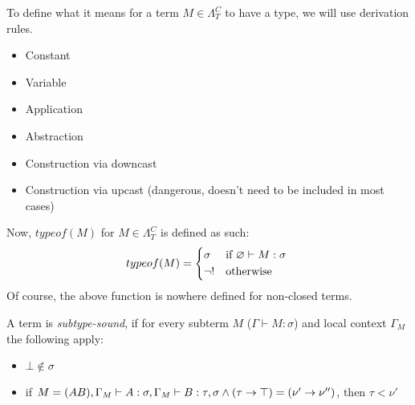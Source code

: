 \documentclass[main.tex]{subfiles}
\begin{document}
\begin{defn}
    To define what it means for a term $M \in \Lambda_T^C$ to have a type,
    we will use derivation rules.
    \begin{itemize}
        \item Constant
        \item Variable
        \item Application
        \item Abstraction
        \item Construction via downcast
        \item Construction via upcast (dangerous, doesn't need to be included in most cases)
    \end{itemize}

    Now, $typeof(M)$ for $M \in \Lambda_T^C$ is defined as such:
    \[
        typeof(M) =
        \begin{cases*}
            \sigma & if $\varnothing \vdash M : \sigma$ \\
            \neg ! & otherwise
        \end{cases*}
    \]
    Of course, the above function is nowhere defined for non-closed terms.
\end{defn}

\begin{defn}
    A term is \emph{subtype-sound}, if for every subterm $M$
    ($\Gamma \vdash M : \sigma$) and local context
    $\Gamma_M$ the following apply:
    \begin{itemize}
        \item $\bot \not \in \sigma$
        \item if $M = (AB), \Gamma_M \vdash A : \sigma, \Gamma_M \vdash B : \tau,
            \sigma \wedge (\tau \rightarrow \top) = (\nu' \rightarrow \nu'')$, then
            $\tau \less \nu'$
    \end{itemize}
\end{defn}
\end{document}
